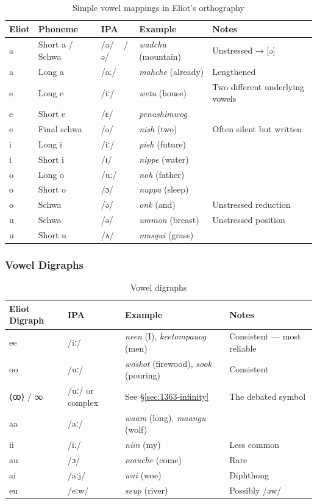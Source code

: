 \begin{table}[h]
\centering
\begin{tabular}{lllll}
\toprule
Eliot & Phoneme & IPA & Example & Notes \\
\midrule
a & Short a / Schwa & /a/ ~ /ə/ & \textit{wadchu} (mountain) & Unstressed → [ə] \\
a & Long a & /aː/ & \textit{mahche} (already) & Lengthened \\
e & Long e & /iː/ & \textit{wetu} (house) & Two different underlying vowels \\
e & Short e & /ɛ/ & \textit{penashimwog} & \\
e & Final schwa & /ə/ & \textit{nish} (two) & Often silent but written \\
i & Long i & /iː/ & \textit{pish} (future) & \\
i & Short i & /ɪ/ & \textit{nippe} (water) & \\
o & Long o & /uː/ & \textit{noh} (father) & \\
o & Short o & /ɔ/ & \textit{nuppa} (sleep) & \\
o & Schwa & /ə/ & \textit{onk} (and) & Unstressed reduction \\
u & Schwa & /ə/ & \textit{ummon} (breast) & Unstressed position \\
u & Short u & /ʌ/ & \textit{musqui} (grass) & \\
\bottomrule
\end{tabular}
\caption{Simple vowel mappings in Eliot's orthography}
\label{tab:1363-vowels}
\end{table}

\subsubsection{Vowel Digraphs}

\begin{table}[h]
\centering
\begin{tabular}{llll}
\toprule
Eliot Digraph & IPA & Example & Notes \\
\midrule
ee & /iː/ & \textit{neen} (I), \textit{keetompauog} (men) & Consistent --- most reliable \\
oo & /uː/ & \textit{woskot} (firewood), \textit{sook} (pouring) & Consistent \\
⟨ꝏ⟩ / ∞ & /uː/ or complex & See §\ref{sec:1363-infinity} & The debated symbol \\
aa & /aː/ & \textit{waam} (long), \textit{maangu} (wolf) & \\
ii & /iː/ & \textit{niin} (my) & Less common \\
au & /ɔ/ & \textit{mauche} (come) & Rare \\
ai & /aːj/ & \textit{wai} (woe) & Diphthong \\
eu & /eːw/ & \textit{seup} (river) & Possibly /əw/ \\
\bottomrule
\end{tabular}
\caption{Vowel digraphs}
\label{tab:1363-digraphs}
\end{table}

